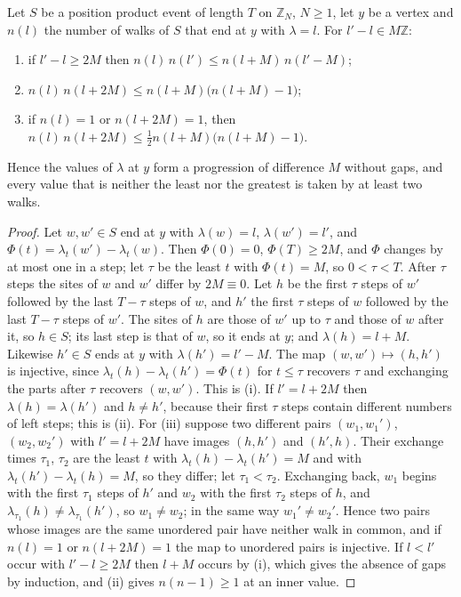 \begin{lemma}\label{lem:winding}
Let $S$ be a position product event of length $T$ on $\mathbb{Z}_N$, $N\ge1$, let $y$ be a vertex and $n(l)$ the number of walks of $S$ that end at $y$ with $\lambda=l$. For $l'-l\in M\mathbb{Z}$:
\begin{enumerate}[label=(\roman*)]
\item if $l'-l\ge2M$ then $n(l)\,n(l')\le n(l+M)\,n(l'-M)$;
\item $n(l)\,n(l+2M)\le n(l+M)\bigl(n(l+M)-1\bigr)$;
\item if $n(l)=1$ or $n(l+2M)=1$, then $n(l)\,n(l+2M)\le\tfrac12n(l+M)\bigl(n(l+M)-1\bigr)$.
\end{enumerate}
Hence the values of $\lambda$ at $y$ form a progression of difference $M$ without gaps, and every value that is neither the least nor the greatest is taken by at least two walks.
\end{lemma}
\begin{proof}
Let $w,w'\in S$ end at $y$ with $\lambda(w)=l$, $\lambda(w')=l'$, and $\Phi(t)=\lambda_t(w')-\lambda_t(w)$. Then $\Phi(0)=0$, $\Phi(T)\ge2M$, and $\Phi$ changes by at most one in a step; let $\tau$ be the least $t$ with $\Phi(t)=M$, so $0<\tau<T$. After $\tau$ steps the sites of $w$ and $w'$ differ by $2M\equiv0$. Let $h$ be the first $\tau$ steps of $w'$ followed by the last $T-\tau$ steps of $w$, and $h'$ the first $\tau$ steps of $w$ followed by the last $T-\tau$ steps of $w'$. The sites of $h$ are those of $w'$ up to $\tau$ and those of $w$ after it, so $h\in S$; its last step is that of $w$, so it ends at $y$; and $\lambda(h)=l+M$. Likewise $h'\in S$ ends at $y$ with $\lambda(h')=l'-M$. The map $(w,w')\mapsto(h,h')$ is injective, since $\lambda_t(h)-\lambda_t(h')=\Phi(t)$ for $t\le\tau$ recovers $\tau$ and exchanging the parts after $\tau$ recovers $(w,w')$. This is (i). If $l'=l+2M$ then $\lambda(h)=\lambda(h')$ and $h\ne h'$, because their first $\tau$ steps contain different numbers of left steps; this is (ii). For (iii) suppose two different pairs $(w_1,w_1')$, $(w_2,w_2')$ with $l'=l+2M$ have images $(h,h')$ and $(h',h)$. Their exchange times $\tau_1$, $\tau_2$ are the least $t$ with $\lambda_t(h)-\lambda_t(h')=M$ and with $\lambda_t(h')-\lambda_t(h)=M$, so they differ; let $\tau_1<\tau_2$. Exchanging back, $w_1$ begins with the first $\tau_1$ steps of $h'$ and $w_2$ with the first $\tau_2$ steps of $h$, and $\lambda_{\tau_1}(h)\ne\lambda_{\tau_1}(h')$, so $w_1\ne w_2$; in the same way $w_1'\ne w_2'$. Hence two pairs whose images are the same unordered pair have neither walk in common, and if $n(l)=1$ or $n(l+2M)=1$ the map to unordered pairs is injective. If $l<l'$ occur with $l'-l\ge2M$ then $l+M$ occurs by (i), which gives the absence of gaps by induction, and (ii) gives $n(n-1)\ge1$ at an inner value.
\end{proof}

